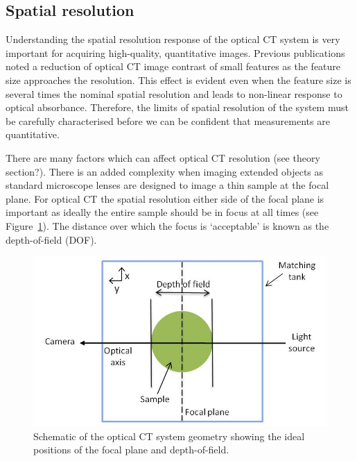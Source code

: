 \subsection{Spatial resolution}

\label{subsubsec:MTF}

Understanding the spatial resolution response of the optical CT system is very important for acquiring high-quality, quantitative images. 
Previous publications noted a reduction of optical CT image contrast of small features as the feature size approaches the resolution. \cite{doranultra-high2013} This effect is evident even when the feature size is several times the nominal spatial resolution and leads to non-linear response to optical absorbance. Therefore, the limits of spatial resolution of the system must be carefully characterised before we can be confident that measurements are quantitative. 

There are many factors which can affect optical CT resolution (see theory section?). There is an added complexity when imaging extended objects as standard microscope lenses are designed to image a thin sample at the focal plane. For optical CT the spatial resolution either side of the focal plane is important as ideally the entire sample should be in focus at all times (see Figure~\ref{fig:idealdof}). The distance over which the focus is `acceptable' is known as the depth-of-field (DOF).

\begin{figure}[H]
	\centering
	\includegraphics[width=0.9\linewidth]{meth_img/ideal_dof_diagram}
	\caption{Schematic of the optical CT system geometry showing the ideal positions of the focal plane and depth-of-field.}
	\label{fig:idealdof}
\end{figure}

